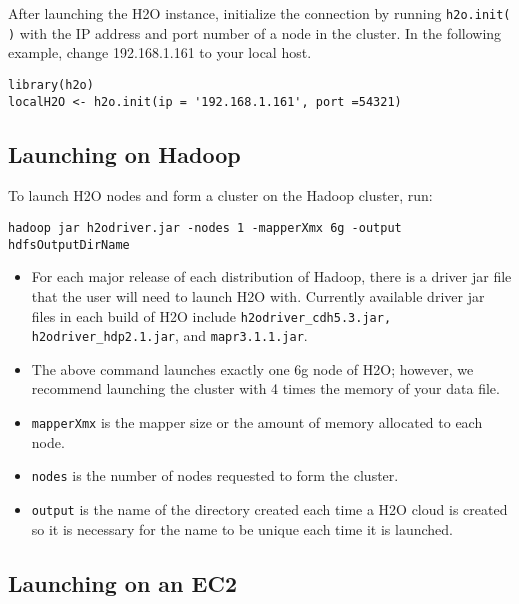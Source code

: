 After launching the H2O instance, initialize the connection by running {\texttt{h2o.init( )}} with the IP address and port number of a node in the cluster. In the following example, change 192.168.1.161 to your local host. 
\begin{lstlisting}[style=R]
library(h2o)
localH2O <- h2o.init(ip = '192.168.1.161', port =54321)
\end{lstlisting}

\subsection{Launching on Hadoop}

To launch H2O nodes and form a cluster on the Hadoop cluster, run:

\begin{lstlisting}[style=R]
hadoop jar h2odriver.jar -nodes 1 -mapperXmx 6g -output hdfsOutputDirName
\end{lstlisting}

\begin{itemize}
\item For each major release of each distribution of Hadoop, there is a driver jar file that the user will need to launch H2O with. Currently available driver jar files in each build of H2O include {\texttt{h2odriver\_cdh5.3.jar, h2odriver\_hdp2.1.jar}}, and {\texttt{mapr3.1.1.jar}}.
\item The above command launches exactly one 6g node of H2O; however,  we recommend launching the cluster with 4 times the memory of your data file.
\item{\texttt{mapperXmx}} is the mapper size or the amount of memory allocated to each node.
\item{\texttt{nodes}} is the number of nodes requested to form the cluster.
\item{\texttt{output}} is the name of the directory created each time a H2O cloud is created so it is necessary for the name to be unique each time it is launched.
\end{itemize}


\subsection{Launching on an EC2}

